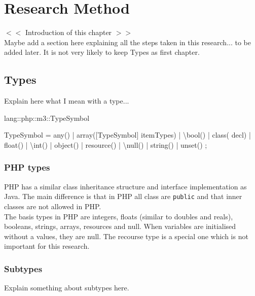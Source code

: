 \documentclass[../main.tex]{subfiles}
\begin{document}
    \chapter{Research Method}\label{chap:research_method}
    $<<$ Introduction of this chapter $>>$
    \\
    Maybe add a section here explaining all the steps taken in this research... to be added later.
    It is not very likely to keep Types as first chapter.
    \blindtext %
    
    \section{Types}
    Explain here what I mean with a type...
    
    \begin{rascal}
 lang::php::m3::TypeSymbol

 TypeSymbol
  = any()
  | array([TypeSymbol] itemTypes)
  | \textbackslash{}bool()
  | class( decl)
  | float()
  | \textbackslash{}int()
  | object()
  | resource()
  | \textbackslash{}null()
  | string()
  | unset()
  ; 
    \end{rascal}
    
    \subsection{PHP types}
    PHP has a similar class inheritance structure and interface implementation as Java.
    The main difference is that in PHP all class are \texttt{public} and that inner classes are not allowed in PHP. 
    \\
    The basis types in PHP are integers, floats (similar to doubles and reals), booleans, strings, arrays, resources and null.
    When variables are initialised without a values, they are null. The recourse type is a special one which is not important for this research.
 
    \subsection{Subtypes}
    
    Explain something about subtypes here.
    \\
    \blindtext %
    
\end{document}
